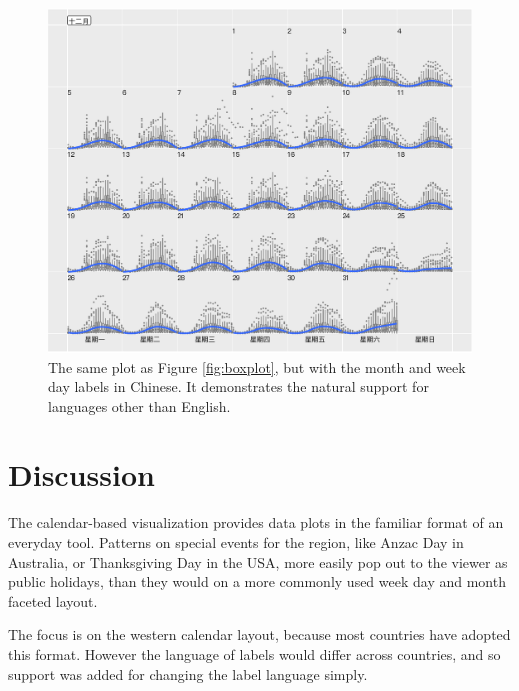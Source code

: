 \begin{Schunk}
\begin{figure}

{\centering \includegraphics[width=\textwidth]{img/chn-1-embedded} 

}

\caption{The same plot as Figure \ref{fig:boxplot}, but with the month and week day labels in Chinese. It demonstrates the natural support for languages other than English.}\label{fig:chn-embedded}
\end{figure}
\end{Schunk}

\hypertarget{discussion}{%
\section{Discussion}\label{discussion}}

\label{sec:discussion}

The calendar-based visualization provides data plots in the familiar
format of an everyday tool. Patterns on special events for the region,
like Anzac Day in Australia, or Thanksgiving Day in the USA, more easily
pop out to the viewer as public holidays, than they would on a more
commonly used week day and month faceted layout.

The focus is on the western calendar layout, because most countries have
adopted this format. However the language of labels would differ across
countries, and so support was added for changing the label language
simply.


